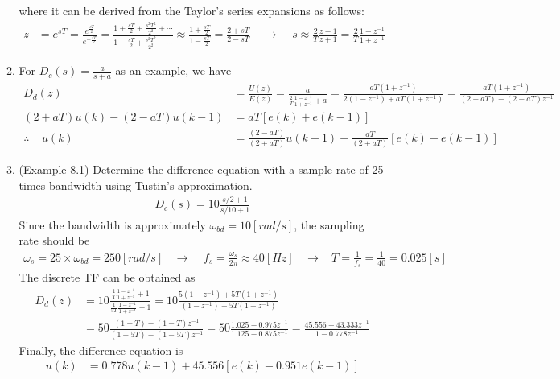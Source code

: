 \documentclass[landscape,14pt]{oblivoir}
\begin{document}
\begin{itemize}
\begin{enumerate}
		where it can be derived from the Taylor's series expansions as follows:
		\begin{align*}
			z &= e^{sT} = \frac{e^{\frac{sT}{2}}}{e^{-\frac{sT}{2}}} 
			= \frac{1 + \frac{sT}{2} + \frac{s^2T^2}{2^2} + \cdots}{1 - \frac{sT}{2} + \frac{s^2T^2}{2^2} - \cdots} \approx  \frac{1 + \frac{sT}{2}}{1 - \frac{sT}{2}}  = \frac{2+sT}{2-sT} 
			~~~~~\rightarrow~~~~~ s \approx  \frac{2}{T} \frac{z-1}{z+1} = \frac{2}{T} \frac{1-z^{-1}}{1+z^{-1}}
		\end{align*}
		\item For $D_c(s) = \frac{a}{s+a}$ as an example, we have 
		\begin{align*}
			D_d(z) &= \frac{U(z)}{E(z)} = \frac{a}{\frac{2}{T} \frac{1-z^{-1}}{1+z^{-1}}+a} = \frac{aT(1+z^{-1})}{2(1-z^{-1}) + aT (1+z^{-1})} = \frac{aT(1+z^{-1})}{(2+aT) - (2-aT)z^{-1}} \\
			(2+aT) u(k) - (2-aT) u(k-1) &= aT [ e(k) + e(k-1) ]  \\
			\therefore~~~~~
			u(k) &= \frac{(2-aT)}{(2+aT)} u(k-1) + \frac{aT}{(2+aT)} [ e(k) + e(k-1) ] 
		\end{align*}
%
\newpage
%
		\item (Example 8.1) Determine the difference equation with a sample rate of 25 times bandwidth using Tustin's approximation. 
		\begin{align*}
			D_c(s) = 10 \frac{s/2+1}{s/10+1}
		\end{align*}
		Since the bandwidth is approximately $\omega_{bd} = 10[rad/s]$, the sampling rate should be
		\begin{align*}
			\omega_s = 25 \times \omega_{bd} = 250 [rad/s] ~~~~ \rightarrow~~~~~ f_s = \frac{\omega_s}{2\pi} \approx 40[Hz] ~~~~\rightarrow~~~~ T = \frac{1}{f_s} = \frac{1}{40} = 0.025[s]
		\end{align*}
		The discrete TF can be obtained as 
		\begin{align*}
			D_d(z) &= 10 \frac{\frac{1}{T} \frac{1-z^{-1}}{1+z^{-1}}+1}{\frac{1}{5T} \frac{1-z^{-1}}{1+z^{-1}}+1} =  10 \frac{5(1-z^{-1})+ 5T(1+z^{-1})}{(1-z^{-1})+ 5T(1+z^{-1})} \\
			&= 50 \frac{(1+T) - (1-T)z^{-1}}{(1+5T) - (1-5T)z^{-1}} 
			= 50 \frac{1.025 - 0.975z^{-1}}{1.125 - 0.875z^{-1}} 
			= \frac{45.556 - 43.333 z^{-1}}{1 - 0.778z^{-1}}
		\end{align*}
		Finally, the difference equation is 
		\begin{align*}
			u(k) &= 0.778 u(k-1) + 45.556 [ e(k) -  0.951 e(k-1) ]
		\end{align*}

\end{enumerate}
\end{itemize}
\end{document}
